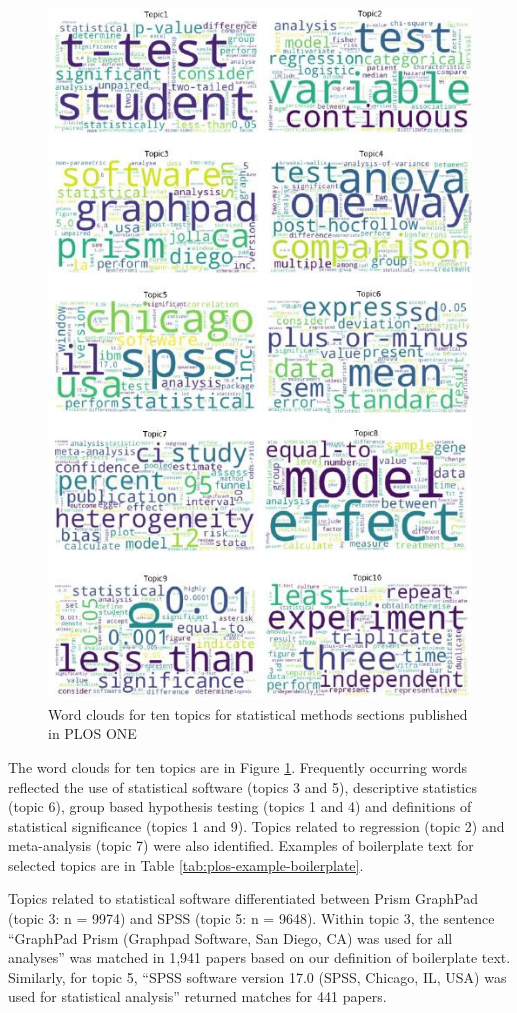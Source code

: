 \documentclass[12pt]{article}
\begin{document}
\begin{figure}

{\centering \includegraphics[width=0.8\linewidth]{figures/ploswordclouds} 

}

\caption{\label{fig:plos-clouds}Word clouds for ten topics for statistical methods sections published in PLOS ONE}\label{fig:plos-clouds}
\end{figure}

The word clouds for ten topics are in Figure \ref{fig:plos-clouds}.
Frequently occurring words reflected the use of statistical software
(topics 3 and 5), descriptive statistics (topic 6), group based
hypothesis testing (topics 1 and 4) and definitions of statistical
significance (topics 1 and 9). Topics related to
regression (topic 2) and meta-analysis (topic 7) were also identified.
Examples of boilerplate text for selected topics are in Table
\ref{tab:plos-example-boilerplate}.

Topics related to statistical software differentiated between Prism
GraphPad (topic 3: n = 9974) and SPSS (topic 5: n = 9648).
Within topic 3, the sentence ``GraphPad Prism (Graphpad Software, San
Diego, CA) was used for all analyses'' was matched in 1,941 papers based on our definition of boilerplate text.
Similarly, for topic 5, ``SPSS software version
17.0 (SPSS, Chicago, IL, USA) was used for statistical analysis'' returned matches for 441 papers.
\end{document}

